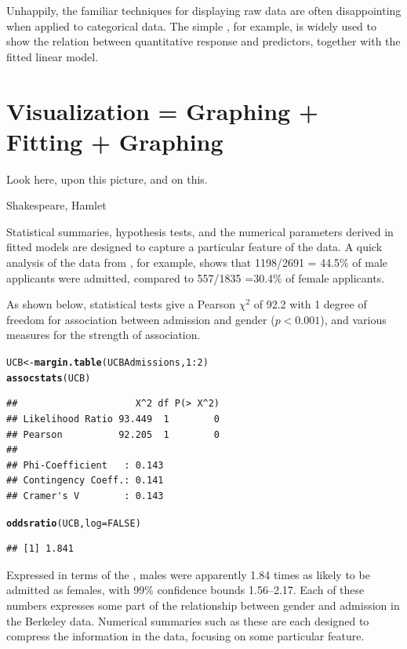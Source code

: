 \documentclass[11pt]{book}\usepackage[]{graphicx}\usepackage[]{color}
\makeatletter
\newcommand{\hlnum}[1]{\textcolor[rgb]{0.686,0.059,0.569}{#1}}%
\newcommand{\hlopt}[1]{\textcolor[rgb]{0,0,0}{#1}}%
\newcommand{\hlstd}[1]{\textcolor[rgb]{0.345,0.345,0.345}{#1}}%
\newcommand{\hlkwb}[1]{\textcolor[rgb]{0.69,0.353,0.396}{#1}}%
\newcommand{\hlkwc}[1]{\textcolor[rgb]{0.333,0.667,0.333}{#1}}%
\newcommand{\hlkwd}[1]{\textcolor[rgb]{0.737,0.353,0.396}{\textbf{#1}}}%
\newenvironment{kframe}{%
 \def\at@end@of@kframe{}%
 \ifinner\ifhmode%
  \def\at@end@of@kframe{\end{minipage}}%
  \begin{minipage}{\columnwidth}%
 \fi\fi%
 \def\FrameCommand##1{\hskip\@totalleftmargin \hskip-\fboxsep
 \colorbox{shadecolor}{##1}\hskip-\fboxsep
     \hskip-\linewidth \hskip-\@totalleftmargin \hskip\columnwidth}%
 \MakeFramed {\advance\hsize-\width
   \@totalleftmargin\z@ \linewidth\hsize
   \@setminipage}}%
 {\par\unskip\endMakeFramed%
 \at@end@of@kframe}
\newenvironment{knitrout}{}{} %
\renewenvironment{knitrout}{\small\renewcommand{\baselinestretch}{.85}}{} %
\makeatother
\begin{document}
Unhappily, the familiar techniques for displaying raw data are
often disappointing when applied to categorical data.
The simple \scat, for example, is widely used to show
the relation between
quantitative response and predictors, together with the fitted linear
model.


\section{Visualization = Graphing + Fitting + Graphing}\label{sec:vis}
\epigraph{Look here, upon this picture, and on this.}{Shakespeare, Hamlet}

Statistical summaries, hypothesis tests, and the numerical parameters
derived in fitted models are designed to capture a particular feature of the
data.  A quick analysis of the data from , for example,
shows that 
1198/2691 = 44.5\% of male applicants were admitted, compared to
557/1835 =30.4\% of female applicants. 

As shown below, statistical tests 
give a Pearson $\chi^2$ of 92.2
with 1 degree of freedom
for association between admission and gender ($p < 0.001$), and
various measures for the strength of association.
\begin{knitrout}
\color{fgcolor}\begin{kframe}
\begin{alltt}
\hlstd{UCB} \hlkwb{<-} \hlkwd{margin.table}\hlstd{(UCBAdmissions,} \hlnum{1}\hlopt{:}\hlnum{2}\hlstd{)}
\hlkwd{assocstats}\hlstd{(UCB)}
\end{alltt}
\begin{verbatim}
##                     X^2 df P(> X^2)
## Likelihood Ratio 93.449  1        0
## Pearson          92.205  1        0
## 
## Phi-Coefficient   : 0.143 
## Contingency Coeff.: 0.141 
## Cramer's V        : 0.143
\end{verbatim}
\begin{alltt}
\hlkwd{oddsratio}\hlstd{(UCB,} \hlkwc{log}\hlstd{=}\hlnum{FALSE}\hlstd{)}
\end{alltt}
\begin{verbatim}
## [1] 1.841
\end{verbatim}
\end{kframe}
\end{knitrout}


Expressed in terms of the , males were apparently
1.84 times as likely
to be admitted as females, with 99\% confidence bounds
1.56--2.17.
Each of these numbers expresses some part of the relationship between
gender and admission in the Berkeley data.
Numerical summaries such as these are each
designed to compress the information in the data, focusing on some particular
feature.
\end{document}
